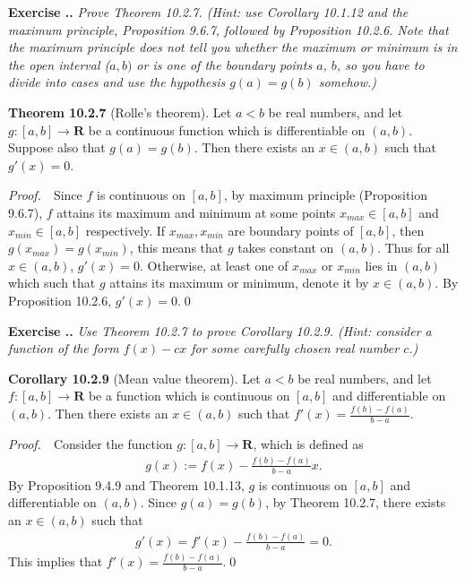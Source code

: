\documentclass{book}
\newcommand{\pff}{\vspace{.25em}\noindent\emph{Proof.}~~}
\newcommand{\titl}[1]{\noindent\textbf{#1}}
\newcounter{Exercise}[section]
\renewcommand{\theExercise}{\thesection.\arabic{Exercise}.}
\newcommand{\new}{\vspace{1.5em}\noindent\textbf{{Exercise \stepcounter{Exercise}\textbf{\theExercise}}} }
\begin{document}
\new\emph{Prove Theorem 10.2.7. (Hint: use Corollary 10.1.12 and the maximum principle, Proposition 9.6.7, followed by Proposition 10.2.6. Note that the maximum principle does not tell you whether the maximum or minimum is in the open interval ($a,b)$ or is one of the boundary points $a$, $b$, so you have to divide into cases and use the hypothesis $g(a)=g(b)$ somehow.)}

\begin{framed}
\titl{Theorem 10.2.7} (Rolle's theorem). Let $a<b$ be real numbers, and let $g:[a,b]\to\mathbf{R}$ be a continuous function which is differentiable on $(a,b)$. Suppose also that $g(a)=g(b)$. Then there exists an $x\in(a,b)$ such that $g'(x)=0$.
\end{framed}

\pff Since $f$ is continuous on $[a,b]$, by maximum principle (Proposition 9.6.7), $f$ attains its maximum and minimum at some points $x_{max}\in[a,b]$ and $x_{min}\in[a,b]$ respectively. If $x_{max},x_{min}$ are boundary points of $[a,b]$, then $g(x_{max})=g(x_{min})$, this means that $g$ takes constant on $(a,b)$. Thus for all $x\in(a,b)$, $g'(x)=0$. Otherwise, at least one of $x_{max}$ or $x_{min}$ lies in $(a,b)$ which such that $g$ attains its maximum or minimum, denote it by $x\in(a,b)$. By Proposition 10.2.6, $g'(x)=0$.\qed

\new\emph{Use Theorem 10.2.7 to prove Corollary 10.2.9. (Hint: consider a function of the form $f(x)-cx$ for some carefully chosen real number $c$.)}

\begin{framed}
\titl{Corollary 10.2.9} (Mean value theorem). Let $a<b$ be real numbers, and let $f:[a,b]\to\mathbf{R}$ be a function which is continuous on $[a,b]$ and differentiable on $(a,b)$. Then there exists an $x\in(a,b)$ such that $f'(x)=\frac{f(b)-f(a)}{b-a}$.
\end{framed}

\pff Consider the function $g:[a,b]\to\mathbf{R}$, which is defined as
    \begin{align*}
        g(x):=f(x)-\frac{f(b)-f(a)}{b-a}x.
    \end{align*}
By Proposition 9.4.9 and Theorem 10.1.13, $g$ is continuous on $[a,b]$ and differentiable on $(a,b)$. Since $g(a)=g(b)$, by Theorem 10.2.7, there exists an $x\in(a,b)$ such that
    \begin{align*}
        g'(x)=f'(x)-\frac{f(b)-f(a)}{b-a}=0.
    \end{align*}
This implies that $f'(x)=\frac{f(b)-f(a)}{b-a}$.\qed
\end{document}
